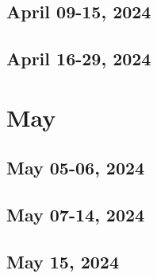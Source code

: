 \section{April 09-15, 2024}

\section{April 16-29, 2024}



\chapter{May}
\section{May 05-06, 2024}

\section{May 07-14, 2024}

\section{May 15, 2024}
